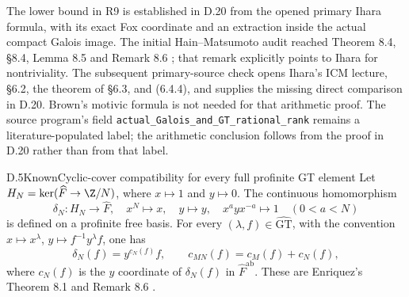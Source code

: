 The lower bound in R9 is established in D.20 from the opened primary
Ihara formula, with its exact Fox coordinate and an extraction inside
the actual compact Galois image. The initial Hain--Matsumoto audit
reached Theorem 8.4, \S8.4, Lemma 8.5 and Remark 8.6
\cite{DE_HainMatsumoto2003}; that remark explicitly points to Ihara
for nontriviality. The subsequent primary-source check opens Ihara's
ICM lecture, \S6.2, the theorem of \S6.3, and (6.4.4), and supplies
the missing direct comparison in D.20. Brown's motivic formula
\cite[(1.3)]{DE_Brown2015} is not needed for that arithmetic proof.
The source program's field
\texttt{actual\_Galois\_and\_GT\_rational\_rank} remains a
literature-populated label; the arithmetic conclusion follows from
the proof in D.20 rather than from that label.

\begin{statement}{D.5}{Known}{Cyclic-cover compatibility for every full profinite GT element}
Let $H_N=\ker(\widehat F\to\Z/N)$, where $x\mapsto1$ and $y\mapsto0$.
The continuous homomorphism
\[
 \delta_N:H_N\longrightarrow\widehat F,
 \quad x^N\mapsto x,\quad y\mapsto y,\quad
 x^ayx^{-a}\mapsto1\quad(0<a<N)
\]
is defined on a profinite free basis. For every
$(\lambda,f)\in\widehat{\mathrm{GT}}$, with the convention
$x\mapsto x^\lambda$, $y\mapsto f^{-1}y^\lambda f$, one has
\[
 \delta_N(f)=y^{c_N(f)}f,\qquad
 c_{MN}(f)=c_M(f)+c_N(f),
\]
where $c_N(f)$ is the $y$ coordinate of $\delta_N(f)$ in
$\widehat F^{\mathrm{ab}}$. These are Enriquez's Theorem 8.1 and
Remark 8.6 \cite{DE_Enriquez2007}.
\end{statement}
